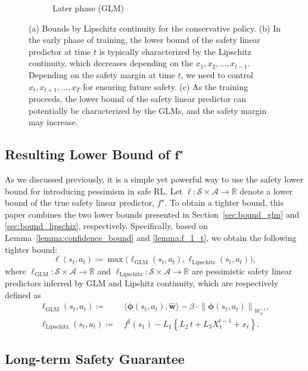 \documentclass[letterpaper]{article} %
\newcommand{\R}{\mathbb{R}}
\newcommand{\cA}{\mathcal{A}}
\newcommand{\cS}{\mathcal{S}}
\newcommand{\bphi}{\bm{\phi}}
\newcommand{\iprod}[2]{\langle #1, #2 \rangle}
\newcommand{\onlynorm}[1]{\left\|{#1}\right\|}
\begin{document}
\begin{figure}[t]
\begin{subfigure}[b]{0.33\textwidth}
        \caption{Later phase (GLM)}
        \label{fig:point_maxcost}
    \end{subfigure}
    \caption{(a) Bounds by Lipschitz continuity for the conservative policy. (b) In the early phase of training, the lower bound of the safety linear predictor at time $t$ is typically characterized by the Lipschitz continuity, which decreases depending on the $x_1, x_2, \ldots, x_{t-1}$. Depending on the safety margin at time $t$, we need to control $x_{t}, x_{t+1}, \ldots, x_T$ for ensuring future safety. (c) As the training proceeds, the lower bound of the safety linear predictor can potentially be characterized by the GLMs, and the safety margin may increase.}
    \label{fig:long_term_safety}
\end{figure}

\subsection{Resulting Lower Bound of $\bm{f^\star}$}

As we discussed previously, it is a simple yet powerful way to use the safety lower bound for introducing pessimism in safe RL.
Let $\ell: \cS \times \cA \rightarrow \R$ denote a lower bound of the true safety linear predictor, $f^\star$. 
%
To obtain a tighter bound, this paper combines the two lower bounds presented in Section~\ref{sec:bound_glm} and \ref{sec:bound_lipschiz}, respectively.
Specifically, based on Lemma~\ref{lemma:confidence_bound} and \ref{lemma:f_1_t}, we obtain the following tighter bound:
%
\begin{equation}
    \ell(s_t, a_t) \coloneqq \max \bigl(\ell_\text{GLM}(s_t, a_t), \ell_\text{Lipschitz}(s_t, a_t) \bigr),
\end{equation}
%
where $\ell_\text{GLM}: \cS \times \cA \rightarrow \R$ and $\ell_\text{Lipschitz}: \cS \times \cA \rightarrow \R$ are pessimistic safety linear predictors inferred by GLM and Lipshitz continuity, which are respectively defined as
%
\begin{align*}
    \ell_\text{GLM}(s_t, a_t) 
    \coloneqq &\ \iprod{\bphi(s_t, a_t)}{\hat{\bm{w}}} - \beta \cdot \onlynorm{\bphi(s_t, a_t)}_{W_n^{-1}}, \\
    \ell_\text{Lipschitz}(s_t, a_t)
    \coloneqq &\ f^\sharp(s_1) - L_1 \left\{L_2\, t + L_3 X_{1}^{t-1} + x_{t} \right\}.
\end{align*}

\subsection{Long-term Safety Guarantee}
\end{document}
